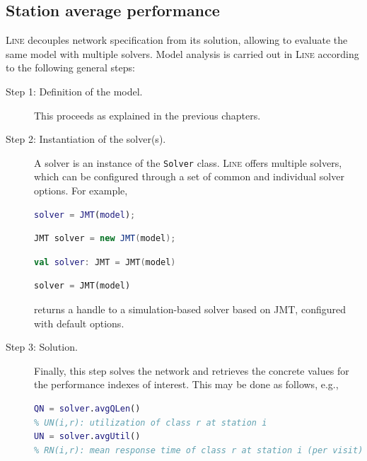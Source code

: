 \subsection{Station average performance}
\textsc{Line} decouples network specification from its solution, allowing to evaluate the same model with multiple solvers.
Model analysis is carried out in \textsc{Line} according to the following general steps:
\begin{description}
\item[Step 1: Definition of the model.] This proceeds as explained in the previous chapters.
\item[Step 2: Instantiation of the solver(s).] A solver is an instance of the \texttt{Solver} class. \textsc{Line} offers multiple solvers, which can be configured through a set of common and individual solver options. For example,
\begin{MATLAB}
\begin{lstlisting}[language = matlab]
solver = JMT(model);
\end{lstlisting}
\end{MATLAB}
\begin{JAVA}
\begin{lstlisting}[language = java, basicstyle=\ttfamily\scriptsize]
JMT solver = new JMT(model);
\end{lstlisting}
\end{JAVA}
\begin{KOTLIN}
\begin{lstlisting}[language = kotlin, basicstyle=\ttfamily\scriptsize]
val solver: JMT = JMT(model)
\end{lstlisting}
\end{KOTLIN}
\begin{PYTHON}
\begin{lstlisting}[language = python]
solver = JMT(model)
\end{lstlisting}
\end{PYTHON}
returns a handle to a simulation-based solver based on JMT, configured with default options.
\item[Step 3: Solution.] Finally, this step solves the network and retrieves the concrete values for the performance indexes of interest. This may be done as follows, e.g.,
\begin{MATLAB}
\begin{lstlisting}[language = matlab]
% QN(i,r): mean queue-length of class r at station i
QN = solver.avgQLen()
% UN(i,r): utilization of class r at station i
UN = solver.avgUtil()
% RN(i,r): mean response time of class r at station i (per visit)

\end{lstlisting}
\end{MATLAB}
\end{description}
